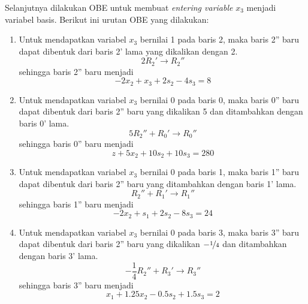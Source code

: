 Selanjutnya dilakukan OBE untuk membuat \textit{entering variable} \(x_3\) menjadi variabel basis. Berikut ini urutan OBE yang dilakukan:
\begin{enumerate}
	\item Untuk mendapatkan variabel \(x_3\) bernilai 1 pada baris 2, maka baris 2'' baru dapat dibentuk dari baris 2' lama yang dikalikan dengan 2.\\
	\begin{equation*}
		2R_2' \rightarrow R_2''
	\end{equation*}
	sehingga baris 2'' baru menjadi
	\begin{equation*}
		-2x_2 + x_3 + 2s_2 - 4s_3 = 8
	\end{equation*}
	
	\item Untuk mendapatkan variabel \(x_3\) bernilai 0 pada baris 0, maka baris 0'' baru dapat dibentuk dari baris 2'' baru yang dikalikan 5 dan ditambahkan dengan baris 0' lama.\\
	\begin{equation*}
		5R_2'' + R_0' \rightarrow R_0''
	\end{equation*}
	sehingga baris 0'' baru menjadi
	\begin{equation*}
		z + 5x_2 + 10s_2 + 10s_3 = 280
	\end{equation*}
	
	\item Untuk mendapatkan variabel \(x_3\) bernilai 0 pada baris 1, maka baris 1'' baru dapat dibentuk dari baris 2'' baru yang ditambahkan dengan baris 1' lama.\\
	\begin{equation*}
		R_2'' + R_1' \rightarrow R_1''
	\end{equation*}
	sehingga baris 1'' baru menjadi
	\begin{equation*}
		-2x_2 + s_1 + 2s_2 - 8s_3 = 24
	\end{equation*}
	
	\item Untuk mendapatkan variabel \(x_3\) bernilai 0 pada baris 3, maka baris 3'' baru dapat dibentuk dari baris 2'' baru yang dikalikan \(-\nicefrac{1}{4}\) dan ditambahkan dengan baris 3' lama.\\
	\begin{equation*}
		-\frac{1}{4}R_2'' + R_3' \rightarrow R_3''
	\end{equation*}
	sehingga baris 3'' baru menjadi
	\begin{equation*}
		x_1 + 1.25x_2 - 0.5s_2 + 1.5s_3 = 2
	\end{equation*}
\end{enumerate}

